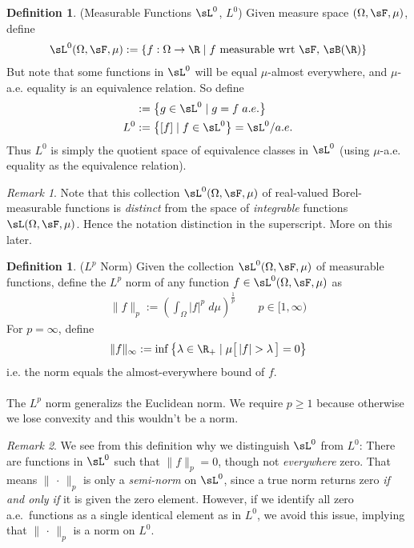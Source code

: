 \documentclass[12pt]{article}
\theoremstyle{plain}
\theoremstyle{definition}
\newtheorem{defn}[thm]{Definition}
\theoremstyle{remark}
\newtheorem*{rmk}{Remark}
\newcommand{\ra}{\rightarrow}
\begin{document}
\begin{defn}(Measurable Functions $\sL^0$, $L^0$)
Given measure space $(\Omega,\sF,\mu)$, define
\begin{align*}
  \sL^0(\Omega,\sF,\mu) :=
  \left\{ f:\Omega\ra\R \; |\; \text{$f$ measurable wrt $\sF$, $\sB(\R)$} \right\}
\end{align*}
But note that some functions in $\sL^0$ will be equal $\mu$-almost
everywhere, and $\mu$-a.e. equality is an equivalence relation. So
define
\begin{align*}
  [f] &:= \left\{ g\in \sL^0 \;|\; g=f \; a.e. \right\} \\
  L^0 &:= \left\{ [f] \;|\; f\in\sL^0 \right\}
  = \sL^0 / a.e.
\end{align*}
Thus $L^0$ is simply the quotient space of equivalence classes in
$\sL^0$ (using $\mu$-a.e. equality as the equivalence relation).
\end{defn}

\begin{rmk}
Note that this collection $\sL^0(\Omega,\sF,\mu)$ of real-valued
Borel-measurable functions is \emph{distinct} from the space of
\emph{integrable} functions $\sL(\Omega,\sF,\mu)$.
Hence the notation distinction in the superscript.
More on this later.
\end{rmk}

\begin{defn}($L^p$ Norm)
Given the collection $\sL^0(\Omega,\sF,\mu)$ of measurable functions,
define the $L^p$ norm of any function $f\in\sL^0(\Omega,\sF,\mu)$ as
\begin{align*}
  \lVert f\rVert_p := \left(\int_\Omega |f|^p\;d\mu\right)^{\frac{1}{p}}
  \qquad p \in [1,\infty)
\end{align*}
For $p=\infty$, define
\begin{align*}
  \lVert f\rVert_\infty := \inf\big\{\lambda \in\R_+ \;|\;
  \mu\big[\,|f|>\lambda\,\big]=0\big\}
\end{align*}
i.e. the norm equals the almost-everywhere bound of $f$.
\\
\\
The $L^p$ norm generalizs the Euclidean norm.
We require $p\geq 1$ because otherwise we lose convexity and this
wouldn't be a norm.
\end{defn}
\begin{rmk}
We see from this definition why we distinguish $\sL^0$ from $L^0$:
There are functions in $\sL^0$ such that $\lVert f\rVert_p = 0$, though
not \emph{everywhere} zero.
That means $\lVert \,\cdot\,\rVert_p$ is only a \emph{semi-norm} on
$\sL^0$, since a true norm returns zero \emph{if and only if}
it is given the zero element.
However, if we identify all zero a.e.\ functions as a single identical
element as in $L^0$, we avoid this issue, implying that
$\lVert \,\cdot\,\rVert_p$ is a norm on $L^0$.
\end{rmk}
\end{document}
